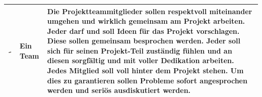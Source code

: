 \begin{center}
\begin{scriptsize}
\begin{tabularx}{\textwidth}{|p{3cm}|p{3cm}|X|}
{\begin{minipage}{3cm}
\begin{center}
        \centerline{\hspace{0.2cm}\includegraphics[width=130]{images/sr/5.png}}
    \end{center}
    \end{minipage}} & Ein Team 
    & Die Projektteammitglieder sollen respektvoll miteinander
    umgehen und wirklich gemeinsam am Projekt arbeiten. 
    Jeder darf und soll Ideen für das Projekt vorschlagen.
    Diese sollen gemeinsam besprochen werden. \newline
    Jeder soll sich für seinen Projekt-Teil zuständig fühlen und
    an diesen sorgfältig und mit voller Dedikation arbeiten. \newline Jedes Mitglied soll voll hinter dem Projekt stehen. Um dies zu garantieren sollen Probleme sofort angesprochen
    werden und seriös ausdiskutiert werden. \\
    \hline
    
\end{tabularx}
\end{scriptsize}
\end{center}
\endgroup


\newpage 



